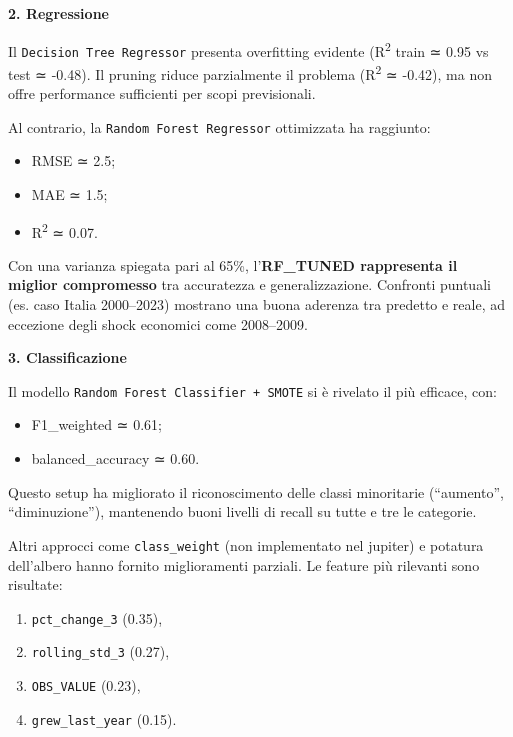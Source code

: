 \documentclass[conference]{IEEEtran}
\begin{document}
\vspace{1em}\noindent\textbf{2. Regressione}

Il \texttt{Decision Tree Regressor} presenta overfitting evidente (R\textsuperscript{2} train ≃ 0.95 vs test ≃ -0.48). Il pruning riduce parzialmente il problema (R\textsuperscript{2} ≃ -0.42), ma non offre performance sufficienti per scopi previsionali.

Al contrario, la \texttt{Random Forest Regressor} ottimizzata ha raggiunto:

\begin{itemize}
  \item RMSE ≃ 2.5;
  \item MAE ≃ 1.5;
  \item R\textsuperscript{2} ≃ 0.07.
\end{itemize}

Con una varianza spiegata pari al 65\%, l’\textbf{RF\_TUNED rappresenta il miglior compromesso} tra accuratezza e generalizzazione. Confronti puntuali (es. caso Italia 2000–2023) mostrano una buona aderenza tra predetto e reale, ad eccezione degli shock economici come 2008–2009.

\vspace{1em}\noindent\textbf{3. Classificazione}

Il modello \texttt{Random Forest Classifier + SMOTE} si è rivelato il più efficace, con:

\begin{itemize}
  \item F1\_weighted ≃ 0.61;
  \item balanced\_accuracy ≃ 0.60.
\end{itemize}

Questo setup ha migliorato il riconoscimento delle classi minoritarie (“aumento”, “diminuzione”), mantenendo buoni livelli di recall su tutte e tre le categorie.

Altri approcci come \texttt{class\_weight} (non implementato nel jupiter) e potatura dell’albero hanno fornito miglioramenti parziali. Le feature più rilevanti sono risultate:

\begin{enumerate}
  \item \texttt{pct\_change\_3} (0.35),
  \item \texttt{rolling\_std\_3} (0.27),
  \item \texttt{OBS\_VALUE} (0.23),
  \item \texttt{grew\_last\_year} (0.15).
\end{enumerate}
\end{document}

